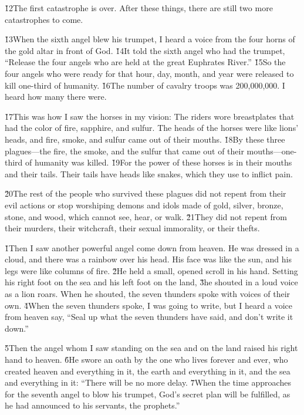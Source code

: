 \v{12}The first catastrophe is over. After these things, there are still two more catastrophes to come.

\v{13}When the sixth angel blew his trumpet, I heard a voice from the four horns of the gold altar in front of God. \v{14}It told the sixth angel who had the trumpet, ``Release the four angels who are held at the great Euphrates River.'' \v{15}So the four angels who were ready for that hour, day, month, and year were released to kill one-third of humanity. \v{16}The number of cavalry troops was 200,000,000. I heard how many there were.

\v{17}This was how I saw the horses in my vision: The riders wore breastplates that had the color of fire, sapphire, and sulfur. The heads of the horses were like lions' heads, and fire, smoke, and sulfur came out of their mouths. \v{18}By these three plagues---the fire, the smoke, and the sulfur that came out of their mouths---one-third of humanity was killed. \v{19}For the power of these horses is in their mouths and their tails. Their tails have heads like snakes, which they use to inflict pain.

\v{20}The rest of the people who survived these plagues did not repent from their evil actions or stop worshiping demons and idols made of gold, silver, bronze, stone, and wood, which cannot see, hear, or walk. \v{21}They did not repent from their murders, their witchcraft, their sexual immorality, or their thefts.

\v{1}Then I saw another powerful angel come down from heaven. He was dressed in a cloud, and there was a rainbow over his head. His face was like the sun, and his legs were like columns of fire. \v{2}He held a small, opened scroll in his hand. Setting his right foot on the sea and his left foot on the land, \v{3}he shouted in a loud voice as a lion roars. When he shouted, the seven thunders spoke with voices of their own. \v{4}When the seven thunders spoke, I was going to write, but I heard a voice from heaven say, ``Seal up what the seven thunders have said, and don't write it down.''

\v{5}Then the angel whom I saw standing on the sea and on the land raised his right hand to heaven. \v{6}He swore an oath by the one who lives forever and ever, who created heaven and everything in it, the earth and everything in it, and the sea and everything in it: ``There will be no more delay. \v{7}When the time approaches for the seventh angel to blow his trumpet, God's secret plan will be fulfilled, as he had announced to his servants, the prophets.''

